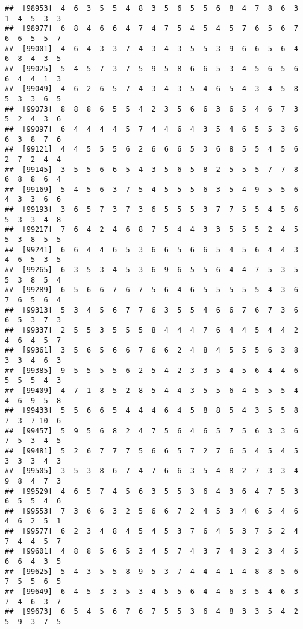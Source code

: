 \documentclass[
]{book}
\begin{document}
\begin{verbatim}
##  [98953]  4  6  3  5  5  4  8  3  5  6  5  5  6  8  4  7  8  6  3  1  4  5  3  3
##  [98977]  6  8  4  6  6  4  7  4  7  5  4  5  4  5  7  6  5  6  7  6  6  5  5  7
##  [99001]  4  6  4  3  3  7  4  3  4  3  5  5  3  9  6  6  5  6  4  6  8  4  3  5
##  [99025]  5  4  5  7  3  7  5  9  5  8  6  6  5  3  4  5  6  5  6  6  4  4  1  3
##  [99049]  4  6  2  6  5  7  4  3  4  3  5  4  6  5  4  3  4  5  8  5  3  3  6  5
##  [99073]  8  8  8  6  5  5  4  2  3  5  6  6  3  6  5  4  6  7  3  5  2  4  3  6
##  [99097]  6  4  4  4  4  5  7  4  4  6  4  3  5  4  6  5  5  3  6  6  3  8  7  6
##  [99121]  4  4  5  5  5  6  2  6  6  6  5  3  6  8  5  5  4  5  6  2  7  2  4  4
##  [99145]  3  5  5  6  6  5  4  3  5  6  5  8  2  5  5  5  7  7  8  6  8  8  6  4
##  [99169]  5  4  5  6  3  7  5  4  5  5  5  6  3  5  4  9  5  5  6  4  3  3  6  6
##  [99193]  3  6  5  7  3  7  3  6  5  5  5  3  7  7  5  5  4  5  6  5  3  3  4  8
##  [99217]  7  6  4  2  4  6  8  7  5  4  4  3  3  5  5  5  2  4  5  5  3  8  5  5
##  [99241]  6  6  4  4  6  5  3  6  6  5  6  6  5  4  5  6  4  4  3  4  6  5  3  5
##  [99265]  6  3  5  3  4  5  3  6  9  6  5  5  6  4  4  7  5  3  5  5  3  8  5  4
##  [99289]  6  5  6  6  7  6  7  5  6  4  6  5  5  5  5  5  4  3  6  7  6  5  6  4
##  [99313]  5  3  4  5  6  7  7  6  3  5  5  4  6  6  7  6  7  3  6  6  5  3  7  3
##  [99337]  2  5  5  3  5  5  5  8  4  4  4  7  6  4  4  5  4  4  2  4  6  4  5  7
##  [99361]  3  5  6  5  6  6  7  6  6  2  4  8  4  5  5  5  6  3  8  3  3  4  6  3
##  [99385]  9  5  5  5  5  6  2  5  4  2  3  3  5  4  5  6  4  4  6  5  5  5  4  3
##  [99409]  4  7  1  8  5  2  8  5  4  4  3  5  5  6  4  5  5  5  4  4  6  9  5  8
##  [99433]  5  5  6  6  5  4  4  4  6  4  5  8  8  5  4  3  5  5  8  7  3  7 10  6
##  [99457]  5  9  5  6  8  2  4  7  5  6  4  6  5  7  5  6  3  3  6  7  5  3  4  5
##  [99481]  5  2  6  7  7  7  5  6  6  5  7  2  7  6  5  4  5  4  5  3  3  3  4  3
##  [99505]  3  5  3  8  6  7  4  7  6  6  3  5  4  8  2  7  3  3  4  9  8  4  7  3
##  [99529]  4  6  5  7  4  5  6  3  5  5  3  6  4  3  6  4  7  5  3  6  5  5  4  6
##  [99553]  7  3  6  6  3  2  5  6  6  7  2  4  5  3  4  6  5  4  6  4  6  2  5  1
##  [99577]  6  2  3  4  8  4  5  4  5  3  7  6  4  5  3  7  5  2  4  7  4  4  5  7
##  [99601]  4  8  8  5  6  5  3  4  5  7  4  3  7  4  3  2  3  4  5  6  6  4  3  5
##  [99625]  5  4  3  5  5  8  9  5  3  7  4  4  4  1  4  8  8  5  6  7  5  5  6  5
##  [99649]  6  4  5  3  3  5  3  4  5  5  6  4  4  6  3  5  4  6  3  7  4  6  3  7
##  [99673]  6  5  4  5  6  7  6  7  5  5  3  6  4  8  3  3  5  4  2  5  9  3  7  5

\end{verbatim}
\end{document}
